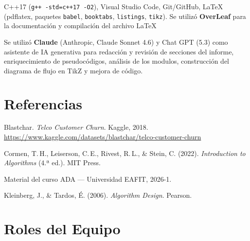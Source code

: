 \documentclass[11pt, a4paper]{article}
\begin{document}
C++17 (\texttt{g++ -std=c++17 -O2}), Visual Studio Code, Git/GitHub,
\LaTeX{} (pdflatex, paquetes \texttt{babel}, \texttt{booktabs}, \texttt{listings},
\texttt{tikz}). Se utilizó \textbf{OverLeaf} para la documentación y compilación del archivo \LaTeX{}

Se utilizó \textbf{Claude} (Anthropic, Claude Sonnet 4.6) y  Chat GPT (5.3) como asistente de IA generativa
para redacción y revisión de secciones del informe, enriquecimiento de pseudocódigos, análisis de los modulos,  construcción del diagrama de flujo en TikZ y mejora de código.

\section{Referencias}

\begin{enumerate}[label={[\arabic*]}]
  \item Blastchar. \textit{Telco Customer Churn}. Kaggle, 2018.
        \url{https://www.kaggle.com/datasets/blastchar/telco-customer-churn}
  \item Cormen, T.\,H., Leiserson, C.\,E., Rivest, R.\,L., \& Stein, C. (2022).
        \textit{Introduction to Algorithms} (4.ª ed.). MIT Press.
  \item Material del curso ADA --- Universidad EAFIT, 2026-1.
  \item Kleinberg, J., \& Tardos, É. (2006). \textit{Algorithm Design}. Pearson.
\end{enumerate}

\section{Roles del Equipo}
\end{document}
